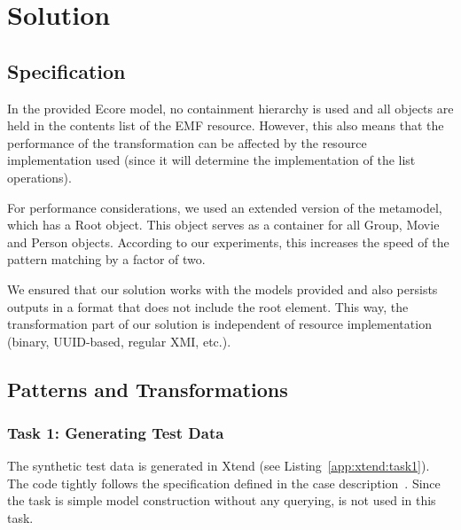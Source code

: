 
\section{Solution}
\label{sec:solution}

\subsection{Specification}

In the provided Ecore model, no containment hierarchy is used and all objects are held in the \textsf{contents} list of the EMF resource. However, this also means that the performance of the transformation can be affected by the resource implementation used (since it will determine the implementation of the list operations).

For performance considerations, we used an extended version of the metamodel, which has a \textsf{Root} object. %
This object serves as a container for all \textsf{Group}, \textsf{Movie} and \textsf{Person} objects. According to our experiments, this increases the speed of the pattern matching by a factor of two.

We ensured that our solution works with the models provided and also persists outputs in a format that does not include the root element. This way, the transformation part of our solution is independent of resource implementation (binary, UUID-based, regular XMI, etc.).

\subsection{Patterns and Transformations}

\subsubsection{Task 1: Generating Test Data}
\label{t1}

The synthetic test data is generated in Xtend (see Listing~\ref{app:xtend:task1}). The code tightly follows the specification defined in the case description~\cite{Horn14}.
Since the task is simple model construction without any querying, \incquery{} is not used in this task. 

